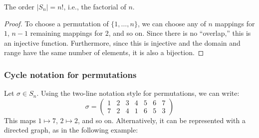 \documentclass{article}
\theoremstyle{plain}
\begin{document}
\begin{theorem}{}{}
The order $|S_n| = n!$, i.e., the factorial of $n$.
\end{theorem}
\begin{proof}
To choose a permutation of $\{1,\ldots,n\}$, we can choose any of $n$ mappings for $1$, $n-1$ remaining mappings for $2$, and so on. Since there is no ``overlap,'' this is an injective function. Furthermore, since this is injective and the domain and range have the same number of elements, it is also a bijection.
\end{proof}

\subsubsection{Cycle notation for permutations}
Let $\sigma \in S_n$. Using the two-line notation style for permutations, we can write:
$$\sigma = \begin{pmatrix}
1 & 2 & 3 & 4 & 5 & 6 & 7 \\
7 & 2 & 4 & 1 & 6 & 5 & 3
\end{pmatrix}$$
This maps $1\mapsto 7$, $2\mapsto 2$, and so on. Alternatively, it can be represented with a directed graph, as in the following example:
\end{document}
